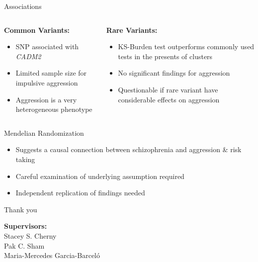 \documentclass{beamer}
\begin{document}
\begin{frame}[t]{Associations}
  \small
  \begin{columns}[T]
    \begin{column}[T]{0.5\textwidth}
     \textbf{Common Variants:}
     \begin{itemize}
       \item SNP associated with \textit{CADM2}
       \item Limited sample size for impulsive aggression
       \item Aggression is a very heterogeneous phenotype
     \end{itemize}
   \end{column}
   \begin{column}[T]{0.5\textwidth}
     \textbf{Rare Variants:}
     \begin{itemize}
       \item KS-Burden test outperforms commonly used tests in the presents of clusters
       \item No significant findings for aggression
       \item Questionable if rare variant have considerable effects on aggression
     \end{itemize}
   \end{column}
 \end{columns} 
\end{frame}

\begin{frame}[t]{Mendelian Randomization}
  \begin{itemize}
    \item Suggests a causal connection between schizophrenia and aggression \& risk taking
    \item Careful examination of underlying assumption required
    \item Independent replication of findings needed
  \end{itemize}
\end{frame}

\begin{frame}[t]{Thank you}

  \begin{center}
  \textbf{Supervisors:} \\
    Stacey S. Cherny\\
    Pak C. Sham\\
    Maria-Mercedes Garcia-Barcel\'o
  \end{center}
  
\end{frame}


\end{document}
